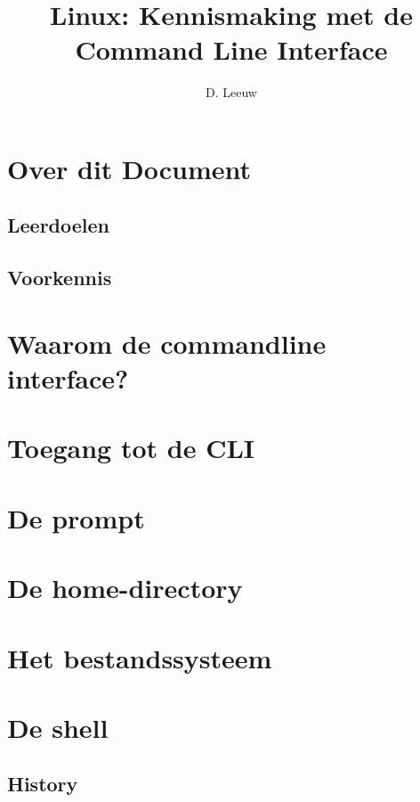 \documentclass[a4paper,12pt,twoside,openright,titlepage]{article}
\author{D. Leeuw}
\title{Linux: Kennismaking met de Command Line Interface}
\date{\today\\
\vfill
\raggedright
\copyright\ 2020-2026 Dennis Leeuw\\
}
\begin{document}

\maketitle


\section{Over dit Document}
\subsection{Leerdoelen}

\subsection{Voorkennis}




\section{Waarom de commandline interface?}

\section{Toegang tot de CLI}

\section{De prompt}

\section{De home-directory}


\section{Het bestandssysteem}


\section{De shell}

\subsection{History}

\end{document}
